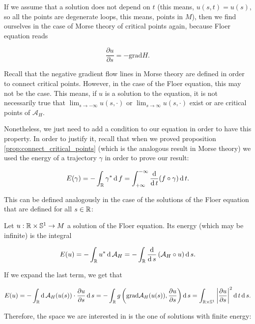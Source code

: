 \begin{rmrk}
If we assume that a solution does not depend on $t$ (this means, $u(s,t) = u(s)$, so all the points are degenerate loops, this means, points in $M$), then we find ourselves in the case of Morse theory of critical points again, because Floer equation reads

$$\frac{\partial u}{\partial s} = - \text{grad}H .$$
\end{rmrk}

Recall that the negative gradient flow lines in Morse theory are defined in order to connect critical points. However, in the case of the Floer equation, this may not be the case. This means, if $u$ is a solution to the equation, it is not necessarily true that $\displaystyle\lim_{s \rightarrow -\infty} u(s,\cdot)$ or $\displaystyle\lim_{s \rightarrow \infty} u(s,\cdot)$ exist or are critical points of $\mathcal{A}_H$.

Nonetheless, we just need to add a condition to our equation in order to have this property. In order to justify it, recall that when we proved proposition \ref{prop:connect_critical_points} (which is the analogous result in Morse theory) we used the energy of a trajectory $\gamma$ in order to prove our result:

$$E(\gamma) = - \int_{\mathbb{R}} \gamma^{\ast} \operatorname d f = \int_{+\infty}^{-\infty} \frac{\operatorname d}{\operatorname d t} (f \circ \gamma) \operatorname d t .$$

This can be defined analogously in the case of the solutions of the Floer equation that are defined for all $s \in \mathbb{R}$:

\begin{deff} \label{definition:floer_energy}
Let $u : \mathbb{R} \times \mathbb{S}^1 \rightarrow M$ a solution of the Floer equation. Its energy (which may be infinite) is the integral

$$E(u) = - \int_{\mathbb{R}} u^{\ast} \operatorname d \mathcal{A}_H = - \int_{\mathbb{R}} \frac{\operatorname d}{\operatorname d s} \left( \mathcal{A}_H \circ u \right) \operatorname d s .$$
\end{deff}

If we expand the last term, we get that

$$E(u) = - \int_{\mathbb{R}} \operatorname d \mathcal{A}_H(u(s)) \cdot \frac{\partial u}{\partial s} \operatorname d s = - \int_{\mathbb{R}} g \left(\text{grad}\mathcal{A}_H(u(s)),\frac{\partial u}{\partial s} \right) \operatorname d s = \int_{\mathbb{R} \times \mathbb{S}^1} \left| \frac{\partial u}{\partial s} \right|^2 \operatorname d t \operatorname d s .$$

Therefore, the space we are interested in is the one of solutions with finite energy:

